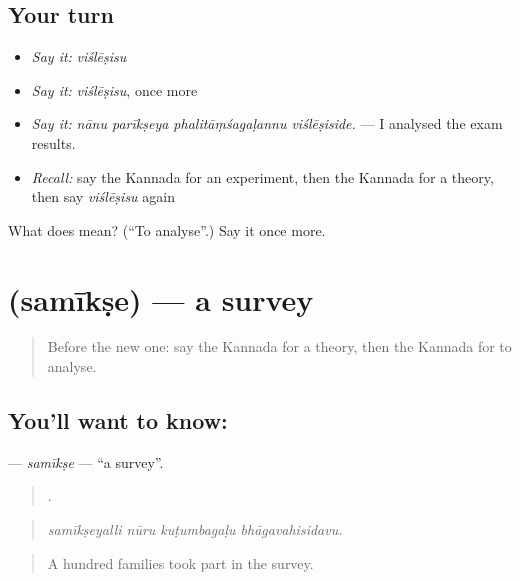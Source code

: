\subsection*{Your turn}
\begin{itemize}
\raggedright
  \item \emph{Say it:} \emph{viślēṣisu}
  \item \emph{Say it:} \emph{viślēṣisu}, once more
  \item \emph{Say it:} \emph{nānu parīkṣeya phalitāṃśagaḷannu viślēṣiside.} — I analysed the exam results.
  \item \emph{Recall:} say the Kannada for an experiment, then the Kannada for a theory, then say \emph{viślēṣisu} again
\end{itemize}

\begin{tcolorbox}[breakable,colback=teal!4,colframe=teal!35!black,title={Before you move on}]
What does  mean? (\textquotedblleft{}To analyse\textquotedblright{}.) Say it once more.
\end{tcolorbox}
\section[\texorpdfstring{\kn{ಸಮೀಕ್ಷೆ} (samīkṣe)}{ಸಮೀಕ್ಷೆ (samīkṣe)}]{ (samīkṣe) — a survey}

\label{lesson:KA-C407-samikse}



\begin{quote}
Before the new one: say the Kannada for a theory, then the Kannada for to analyse.
\end{quote}

\subsection*{You'll want to know: }
\textbf{} — \emph{samīkṣe} — \textquotedblleft{}a survey\textquotedblright{}.

\begin{quote}
   .
\end{quote}

\begin{quote}
\emph{samīkṣeyalli nūru kuṭumbagaḷu bhāgavahisidavu.}
\end{quote}

\begin{quote}
A hundred families took part in the survey.
\end{quote}

